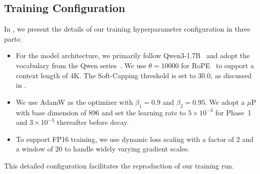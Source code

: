 \subsection{Training Configuration}

In , we present the details of our training hyperparameter configuration in three parts:
\begin{itemize}
    \item For the model architecture, we primarily follow Qwen3-1.7B~\citep{qwen3} and adopt the vocabulary from the Qwen series~\citep{qwen2,qwen3}. We use $\theta = 10000$ for RoPE~\citep{su2024rope} to support a context length of 4K. The Soft-Capping threshold is set to 30.0, as discussed in .
    \item We use AdamW as the optimizer with $\beta_1 = 0.9$ and $\beta_2 = 0.95$. We adopt a $\mu$P with base dimension of 896 and set the learning rate to $5\times10^{-3}$ for Phase~1 and $3\times10^{-3}$ thereafter before decay.
    \item To support FP16 training, we use dynamic loss scaling with a factor of 2 and a window of 20 to handle widely varying gradient scales.
\end{itemize}
This detailed configuration facilitates the reproduction of our training run.


